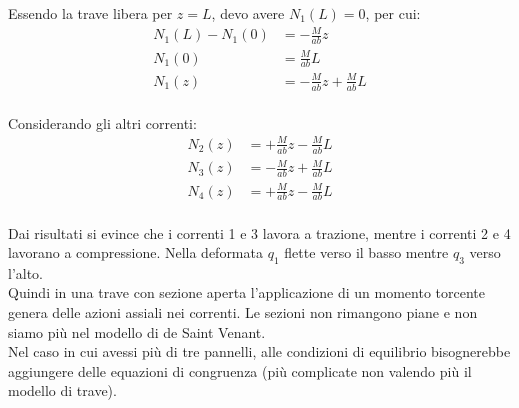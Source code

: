 Essendo la trave libera per $z=L$, devo avere $N_1(L) = 0$, per cui:
\begin{align*}
    N_1(L) - N_1(0)  &=-\frac{M}{ab}z\\
    N_1(0) &= \frac{M}{ab}L\\
     N_1(z) &= -\frac{M}{ab}z+\frac{M}{ab}L \\
\end{align*}

Considerando gli altri correnti:
\begin{align*}
     N_2(z) &= +\frac{M}{ab}z-\frac{M}{ab}L \\
      N_3(z) &= -\frac{M}{ab}z+\frac{M}{ab}L \\
       N_4(z) &= +\frac{M}{ab}z-\frac{M}{ab}L \\
\end{align*}

Dai risultati si evince che i correnti 1 e 3 lavora a trazione, mentre i correnti 2 e 4 lavorano a compressione. Nella deformata $q_1$ flette verso il basso mentre $q_3$ verso l'alto.\\
Quindi in una trave con sezione aperta l'applicazione di un momento torcente genera delle azioni assiali nei correnti. Le sezioni non rimangono piane e non siamo più nel modello di de Saint Venant.\\

Nel caso in cui avessi più di tre pannelli, alle condizioni di equilibrio bisognerebbe aggiungere delle equazioni di congruenza (più complicate non valendo più il modello di trave).